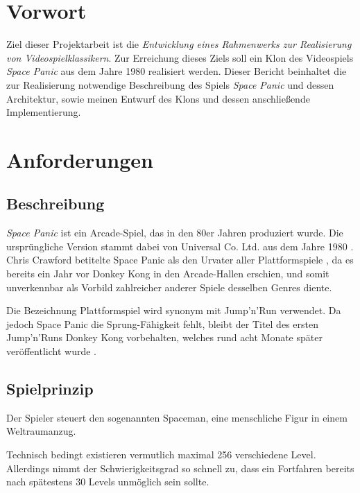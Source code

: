 \documentclass[12pt]{article}
\begin{document}
\tableofcontents


\section{Vorwort}
	Ziel dieser Projektarbeit ist die \textit{Entwicklung eines Rahmenwerks zur Realisierung von Videospielklassikern}. Zur Erreichung dieses Ziels soll ein Klon des Videospiels \textit{Space Panic} aus dem Jahre 1980 realisiert werden. Dieser Bericht beinhaltet die zur Realisierung notwendige Beschreibung des Spiels \textit{Space Panic} und dessen Architektur, sowie meinen Entwurf des Klons und dessen anschließende Implementierung.
    
\section{Anforderungen}
\subsection{Beschreibung}
	\textit{Space Panic} ist ein Arcade-Spiel, das in den 80er Jahren produziert wurde. Die ursprüngliche Version stammt dabei von Universal Co. Ltd. aus dem Jahre 1980 \cite{arcade-museum:space-panic}. Chris Crawford betitelte Space Panic als den Urvater aller Plattformspiele \cite[S. 19]{Crawford:2003:CCG:940762}, da es bereits ein Jahr vor Donkey Kong in den Arcade-Hallen erschien, und somit unverkennbar als Vorbild zahlreicher anderer Spiele desselben Genres diente.
    
	Die Bezeichnung Plattformspiel wird synonym mit Jump'n'Run verwendet. Da jedoch Space Panic die Sprung-Fähigkeit fehlt, bleibt der Titel des ersten Jump'n'Runs Donkey Kong vorbehalten, welches rund acht Monate später veröffentlicht wurde \cite{kotaku:releasedate-dk}.



\subsection{Spielprinzip}
	Der Spieler steuert den sogenannten Spaceman, eine menschliche Figur in einem Weltraumanzug.
    
    Technisch bedingt existieren vermutlich maximal 256 verschiedene Level. Allerdings nimmt der Schwierigkeitsgrad so schnell zu, dass ein Fortfahren bereits nach spätestens 30 Levels unmöglich sein sollte.
    
\end{document}

